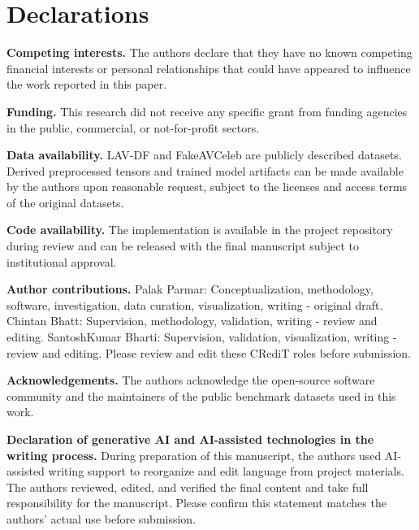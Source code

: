 \documentclass[preprint,12pt,number]{elsarticle}
\begin{document}
\section*{Declarations}

\textbf{Competing interests.} The authors declare that they have no known competing financial interests or personal relationships that could have appeared to influence the work reported in this paper.

\textbf{Funding.} This research did not receive any specific grant from funding agencies in the public, commercial, or not-for-profit sectors.

\textbf{Data availability.} LAV-DF and FakeAVCeleb are publicly described datasets. Derived preprocessed tensors and trained model artifacts can be made available by the authors upon reasonable request, subject to the licenses and access terms of the original datasets.

\textbf{Code availability.} The implementation is available in the project repository during review and can be released with the final manuscript subject to institutional approval.

\textbf{Author contributions.} Palak Parmar: Conceptualization, methodology, software, investigation, data curation, visualization, writing - original draft. Chintan Bhatt: Supervision, methodology, validation, writing - review and editing. SantoshKumar Bharti: Supervision, validation, visualization, writing - review and editing. Please review and edit these CRediT roles before submission.

\textbf{Acknowledgements.} The authors acknowledge the open-source software community and the maintainers of the public benchmark datasets used in this work.

\textbf{Declaration of generative AI and AI-assisted technologies in the writing process.} During preparation of this manuscript, the authors used AI-assisted writing support to reorganize and edit language from project materials. The authors reviewed, edited, and verified the final content and take full responsibility for the manuscript. Please confirm this statement matches the authors' actual use before submission.
\end{document}
